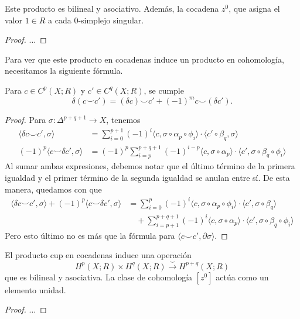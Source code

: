 \begin{lemma}
	Este producto es bilineal y asociativo. Además, la cocadena $z^{0}$, que asigna el valor $1 \in R$ a cada $0$-simplejo singular.
\end{lemma}
\begin{proof}
	...
\end{proof}

Para ver que este producto en cocadenas induce un producto en cohomología, necesitamos la siguiente fórmula.

\begin{lemma}
	Para $c \in C^{p}(X;R)$ y $c' \in C^{q}(X;R)$, se cumple
	\[ \delta(c \smile c') = (\delta c) \smile c' + (-1)^{m} c \smile (\delta c'). \]
\end{lemma}
\begin{proof}
	Para $\sigma \colon \Delta^{p+q+1} \to X$, tenemos
	\begin{align*}
		\langle \delta c \smile c', \sigma \rangle &= \sum_{i=0}^{p + 1} (-1)^{i} \langle c, \sigma \circ \alpha_{p} \circ \phi_{i} \rangle \cdot \langle c' \circ \beta_{q}, \sigma \rangle \\
		(-1)^{p} \langle c \smile \delta c', \sigma \rangle &= (-1)^{p} \sum_{i=p}^{p+q+1} (-1)^{i-p} \langle c, \sigma \circ \alpha_{p} \rangle \cdot \langle c', \sigma \circ \beta_{q} \circ \phi_{i} \rangle
	\end{align*}
	Al sumar ambas expresiones, debemos notar que el último término de la primera igualdad y el primer término de la segunda igualdad se anulan entre sí. De esta manera, quedamos con que
	\begin{align*}
		\langle \delta c \smile c', \sigma \rangle + (-1)^{p}\langle c \smile \delta c', \sigma \rangle &= \sum_{i=0}^{p} (-1)^{i} \langle c, \sigma \circ \alpha_{p} \circ \phi_{i} \rangle \cdot \langle c', \sigma \circ \beta_{q} \rangle \\
		&\quad + \sum_{i=p+1}^{p+q+1} (-1)^{i} \langle c, \sigma \circ \alpha_{p} \rangle \cdot \langle c', \sigma \circ \beta_{q} \circ \phi_{i} \rangle
	\end{align*}
	Pero esto último no es más que la fórmula para $\langle c \smile c', \partial \sigma \rangle$.
\end{proof}

\begin{theorem}
	El producto cup en cocadenas induce una operación
	\[ H^{p}(X;R) \times H^{q}(X;R) \xrightarrow{\smile} H^{p+q}(X;R) \]
	que es bilineal y asociativa. La clase de cohomología $[z^{0}]$ actúa como un elemento unidad.
\end{theorem}
\begin{proof}
	...
\end{proof}

